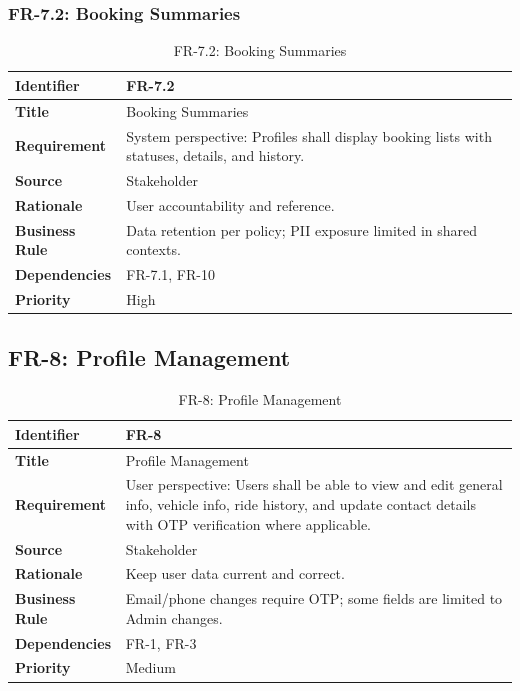 \subsubsection{FR-7.2: Booking Summaries}

\begin{longtable}{|p{3cm}|p{12cm}|}
\caption{FR-7.2: Booking Summaries}
\label{tab:fr-7-2} \\
\hline
\rowcolor{lightgray!30}
\textbf{Identifier} & FR-7.2 \\
\hline
\textbf{Title} & Booking Summaries \\
\hline
\textbf{Requirement} & System perspective: Profiles shall display booking lists with statuses, details, and history. \\
\hline
\textbf{Source} & Stakeholder \\
\hline
\textbf{Rationale} & User accountability and reference. \\
\hline
\textbf{Business Rule} & Data retention per policy; PII exposure limited in shared contexts. \\
\hline
\textbf{Dependencies} & FR-7.1, FR-10 \\
\hline
\textbf{Priority} & High \\
\hline
\end{longtable}

\subsection{FR-8: Profile Management}

\begin{longtable}{|p{3cm}|p{12cm}|}
\caption{FR-8: Profile Management}
\label{tab:fr-8} \\
\hline
\rowcolor{lightgray!30}
\textbf{Identifier} & FR-8 \\
\hline
\textbf{Title} & Profile Management \\
\hline
\textbf{Requirement} & User perspective: Users shall be able to view and edit general info, vehicle info, ride history, and update contact details with OTP verification where applicable. \\
\hline
\textbf{Source} & Stakeholder \\
\hline
\textbf{Rationale} & Keep user data current and correct. \\
\hline
\textbf{Business Rule} & Email/phone changes require OTP; some fields are limited to Admin changes. \\
\hline
\textbf{Dependencies} & FR-1, FR-3 \\
\hline
\textbf{Priority} & Medium \\
\hline
\end{longtable}

